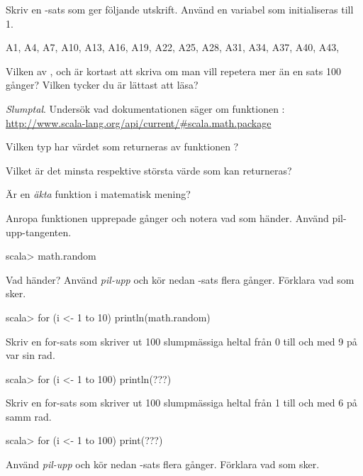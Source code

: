 {{{{\Subtask Skriv en -sats som ger följande utskrift. Använd en variabel  som initialiseras till 1.
\begin{REPL}
A1, A4, A7, A10, A13, A16, A19, A22, A25, A28, A31, A34, A37, A40, A43, 
\end{REPL}

\Subtask\Pen Vilken av ,  och  är kortast att skriva om man vill repetera mer än en sats 100 gånger? Vilken tycker du är lättast att läsa? 

\Task \textit{Slumptal}. Undersök vad dokumentationen säger om funktionen :\\
\url{http://www.scala-lang.org/api/current/#scala.math.package} 

\Subtask\Pen Vilken typ har värdet som returneras av funktionen ? 
 
\Subtask\Pen Vilket är det minsta respektive största värde som kan returneras? 

\Subtask\Pen Är  en \textit{äkta} funktion  i matematisk mening?

\Subtask Anropa funktionen  upprepade gånger och notera vad som händer. Använd pil-upp-tangenten.
\begin{REPL}
scala> math.random
\end{REPL}


\Subtask Vad händer? Använd \textit{pil-upp} och kör nedan -sats flera gånger. Förklara vad som sker.

\begin{REPL}
scala> for (i <- 1 to 10) println(math.random)
\end{REPL}

\Subtask Skriv en for-sats som skriver ut 100 slumpmässiga heltal från 0 till och med 9 på var sin rad. 

\begin{REPL}
scala> for (i <- 1 to 100) println(???)
\end{REPL}

\Subtask Skriv en for-sats som skriver ut 100 slumpmässiga heltal från 1 till och med 6 på samm rad. 

\begin{REPL}
scala> for (i <- 1 to 100) print(???)
\end{REPL}


\Subtask Använd \textit{pil-upp} och kör nedan -sats flera gånger. Förklara vad som sker.

}}}}
